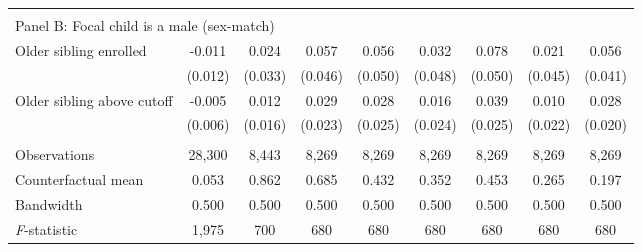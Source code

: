 {{\begin{tabular}{lcccccccc}
&  &  &  & & & & & \\
\multicolumn{10}{l}{Panel B: Focal child is a male (sex-match)} \\
Older sibling enrolled&      -0.011   &       0.024   &       0.057   &       0.056   &       0.032   &       0.078   &       0.021   &       0.056   \\
                    &     (0.012)   &     (0.033)   &     (0.046)   &     (0.050)   &     (0.048)   &     (0.050)   &     (0.045)   &     (0.041)   \\
 
Older sibling above cutoff&      -0.005   &       0.012   &       0.029   &       0.028   &       0.016   &       0.039   &       0.010   &       0.028   \\
                    &     (0.006)   &     (0.016)   &     (0.023)   &     (0.025)   &     (0.024)   &     (0.025)   &     (0.022)   &     (0.020)   \\
                    &               &               &               &               &               &               &               &               \\
Observations        &      28,300   &       8,443   &       8,269   &       8,269   &       8,269   &       8,269   &       8,269   &       8,269   \\
Counterfactual mean &       0.053   &       0.862   &       0.685   &       0.432   &       0.352   &       0.453   &       0.265   &       0.197   \\
Bandwidth           &       0.500   &       0.500   &       0.500   &       0.500   &       0.500   &       0.500   &       0.500   &       0.500   \\
\textit{F}-statistic&       1,975   &         700   &         680   &         680   &         680   &         680   &         680   &         680   \\
 

\bottomrule
\end{tabular}
}
}
